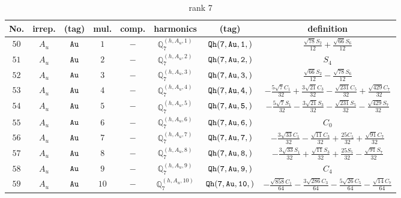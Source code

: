 \documentclass[fleqn,8pt]{jsarticle}
\begin{document}
\begin{table}[ht!]
\begin{center}
\caption{rank 7}
\renewcommand{\arraystretch}{1.3}
\begin{tabular}{cccccccc} \hline \hline
No. & irrep. & (tag) & mul. & comp. & harmonics & (tag) & definition \\ \hline
$ 50 $ & $ A_{u} $ & $ {\tt Au} $ & $ 1 $ & $ - $ & $ \mathbb{Q}_{7}^{(h,A_{u},1)} $ & $ {\tt Qh(7,Au,1,)} $ & $ \frac{\sqrt{78} S_{2}}{12} + \frac{\sqrt{66} S_{6}}{12} $ \\
$ 51 $ & $ A_{u} $ & $ {\tt Au} $ & $ 2 $ & $ - $ & $ \mathbb{Q}_{7}^{(h,A_{u},2)} $ & $ {\tt Qh(7,Au,2,)} $ & $ S_{4} $ \\
$ 52 $ & $ A_{u} $ & $ {\tt Au} $ & $ 3 $ & $ - $ & $ \mathbb{Q}_{7}^{(h,A_{u},3)} $ & $ {\tt Qh(7,Au,3,)} $ & $ \frac{\sqrt{66} S_{2}}{12} - \frac{\sqrt{78} S_{6}}{12} $ \\
$ 53 $ & $ A_{u} $ & $ {\tt Au} $ & $ 4 $ & $ - $ & $ \mathbb{Q}_{7}^{(h,A_{u},4)} $ & $ {\tt Qh(7,Au,4,)} $ & $ - \frac{5 \sqrt{7} C_{1}}{32} + \frac{3 \sqrt{21} C_{3}}{32} - \frac{\sqrt{231} C_{5}}{32} + \frac{\sqrt{429} C_{7}}{32} $ \\
$ 54 $ & $ A_{u} $ & $ {\tt Au} $ & $ 5 $ & $ - $ & $ \mathbb{Q}_{7}^{(h,A_{u},5)} $ & $ {\tt Qh(7,Au,5,)} $ & $ - \frac{5 \sqrt{7} S_{1}}{32} - \frac{3 \sqrt{21} S_{3}}{32} - \frac{\sqrt{231} S_{5}}{32} - \frac{\sqrt{429} S_{7}}{32} $ \\
$ 55 $ & $ A_{u} $ & $ {\tt Au} $ & $ 6 $ & $ - $ & $ \mathbb{Q}_{7}^{(h,A_{u},6)} $ & $ {\tt Qh(7,Au,6,)} $ & $ C_{0} $ \\
$ 56 $ & $ A_{u} $ & $ {\tt Au} $ & $ 7 $ & $ - $ & $ \mathbb{Q}_{7}^{(h,A_{u},7)} $ & $ {\tt Qh(7,Au,7,)} $ & $ - \frac{3 \sqrt{33} C_{1}}{32} - \frac{\sqrt{11} C_{3}}{32} + \frac{25 C_{5}}{32} + \frac{\sqrt{91} C_{7}}{32} $ \\
$ 57 $ & $ A_{u} $ & $ {\tt Au} $ & $ 8 $ & $ - $ & $ \mathbb{Q}_{7}^{(h,A_{u},8)} $ & $ {\tt Qh(7,Au,8,)} $ & $ - \frac{3 \sqrt{33} S_{1}}{32} + \frac{\sqrt{11} S_{3}}{32} + \frac{25 S_{5}}{32} - \frac{\sqrt{91} S_{7}}{32} $ \\
$ 58 $ & $ A_{u} $ & $ {\tt Au} $ & $ 9 $ & $ - $ & $ \mathbb{Q}_{7}^{(h,A_{u},9)} $ & $ {\tt Qh(7,Au,9,)} $ & $ C_{4} $ \\
$ 59 $ & $ A_{u} $ & $ {\tt Au} $ & $ 10 $ & $ - $ & $ \mathbb{Q}_{7}^{(h,A_{u},10)} $ & $ {\tt Qh(7,Au,10,)} $ & $ - \frac{\sqrt{858} C_{1}}{64} - \frac{3 \sqrt{286} C_{3}}{64} - \frac{5 \sqrt{26} C_{5}}{64} - \frac{\sqrt{14} C_{7}}{64} $ \\

\end{tabular}
\end{center}
\end{table}
\end{document}
